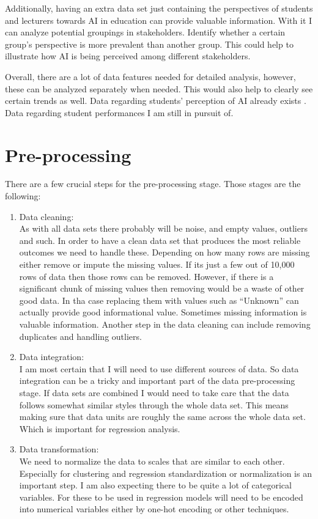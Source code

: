 \documentclass{imc-inf}
\begin{document}
Additionally, having an extra data set just containing the perspectives of students and lecturers towards AI in education can provide valuable information. With it I can analyze potential groupings in stakeholders. Identify whether a certain group’s perspective is more prevalent than another group. This could help to illustrate how AI is being perceived among different stakeholders. 

Overall, there are a lot of data features needed for detailed analysis, however, these can be analyzed separately when needed. This would also help to clearly see certain trends as well. Data regarding students’ perception of AI already exists \cite{5}. Data regarding student performances I am still in pursuit of. 

\section{Pre-processing}
There are a few crucial steps for the pre-processing stage. Those stages are the following:
\begin{enumerate}
	\item Data cleaning: \\
	
	As with all data sets there probably will be noise, and empty values, outliers and such. In order to have a clean data set that produces the most reliable outcomes we need to handle these. Depending on how many rows are missing either remove or impute the missing values. If its just a few out of 10,000 rows of data then those rows can be removed. However, if there is a significant chunk of missing values then removing would be a waste of other good data. In tha case replacing them with values such as “Unknown” can actually provide good informational value. Sometimes missing information is valuable information. Another step in the data cleaning can include removing duplicates and handling outliers. 
	
	\item Data integration:\\
	I am most certain that I will need to use different sources of data. So data integration can be a tricky and important part of the data pre-processing stage. If data sets are combined I would need to take care that the data follows somewhat similar styles through the whole data set. This means making sure that data units are roughly the same across the whole data set. Which is important for regression analysis. 
	
	\item Data transformation:\\
	We need to normalize the data to scales that are similar to each other. Especially for clustering and regression standardization or normalization is an important step. I am also expecting there to be quite a lot of categorical variables. For these to be used in regression models will need to be encoded into numerical variables either by one-hot encoding or other techniques. 
	
	
\end{enumerate}
\end{document}
